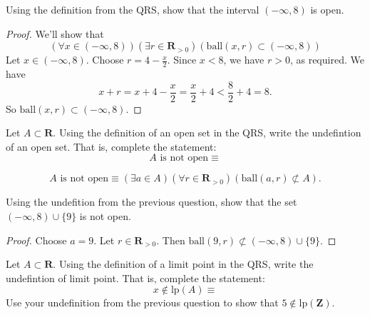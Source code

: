 \documentclass[12pt, fleqn, answers]{exam}
\newcommand{\reals}{\mathbf{R}}
\newcommand{\integers}{\mathbf{Z}}
\newcommand{\lp}{\mathrm{lp}}
\newcommand{\ball}{\mathrm{ball}}
\begin{document}
\begin{questions}
\question Using the definition from the QRS, show that the interval $(-\infty, 8)$ is open.

\begin{solution}
\begin{proof} We'll show that 
\begin{equation*}
   \left(\forall x \in (-\infty, 8)\right) \left(\exists r \in \reals_{>0}\right)(\ball(x,r)  \subset (-\infty, 8))
\end{equation*}
Let $x \in   (-\infty, 8)$. Choose $r = 4 - \frac{x}{2}$. Since $x < 8$, we have $r > 0$, as required.  
We have 
\begin{equation*}
x + r = x + 4  - \frac{x}{2} = \frac{x}{2} + 4 < \frac{8}{2} + 4 = 8.
\end{equation*}
So $\ball(x,r)  \subset (-\infty, 8)$.
\end{proof}
\end{solution}

\question Let $A \subset \reals$.  Using the definition of an open set in the QRS, write
the undefintion of an open set. That is, complete the statement:
\begin{equation*}
  A \text{ is not open} \equiv 
\end{equation*}

\begin{solution}
\begin{equation*}
  A \text{ is not open} \equiv \left(\exists a \in A\right) \left(\forall r \in \reals_{>0}\right) \left(\ball(a,r) \not \subset A \right).
 \end{equation*}
\end{solution}
\question Using the undefition from the previous question, show that the set \mbox{$(-\infty, 8) \cup \{9 \}$} is
not open.

\begin{solution}
\begin{proof}
Choose $a = 9$. Let $r \in \reals_{>0}$. Then $\ball(9,r) \not \subset (-\infty, 8) \cup \{9 \}$.
\end{proof}
\end{solution}
\question Let $A \subset \reals$.  Using the definition of a limit point in the QRS, write
the undefintion of limit point. That is, complete the statement:
\begin{equation*}
  x \not \in \lp(A) \equiv 
\end{equation*}
\question  Use your undefinition from the previous question to show that \(5 \notin  \lp (\integers)\).



\end{questions}
\end{document}
